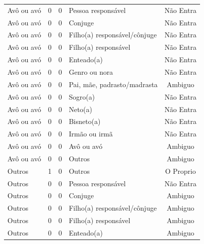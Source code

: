 \documentclass[
	12pt,				%
	openright,			%
	twoside,			%
	a4paper,			%
	english,			%
	french,				%
	spanish,			%
	brazil				%
	]{abntex2}
\begin{document}
\begin{anexosenv}
\begin{longtable}{@{}lcclc@{}}
Avô ou avó                   & 0         & 0        & Pessoa responsável           & Não Entra       \\
Avô ou avó                   & 0         & 0        & Conjuge                      & Não Entra       \\
Avô ou avó                   & 0         & 0        & Filho(a) responsável/cônjuge & Não Entra       \\
Avô ou avó                   & 0         & 0        & Filho(a) responsável         & Não Entra       \\
Avô ou avó                   & 0         & 0        & Enteado(a)                   & Não Entra       \\
Avô ou avó                   & 0         & 0        & Genro ou nora                & Não Entra       \\
Avô ou avó                   & 0         & 0        & Pai, mãe, padrasto/madrasta  & Ambiguo         \\
Avô ou avó                   & 0         & 0        & Sogro(a)                     & Não Entra       \\
Avô ou avó                   & 0         & 0        & Neto(a)                      & Não Entra       \\
Avô ou avó                   & 0         & 0        & Bisneto(a)                   & Não Entra       \\
Avô ou avó                   & 0         & 0        & Irmão ou irmã                & Não Entra       \\
Avô ou avó                   & 0         & 0        & Avô ou avó                   & Ambiguo         \\
Avô ou avó                   & 0         & 0        & Outros                       & Ambiguo         \\
Outros                       & 1         & 0        & Outros                       & O Proprio       \\
Outros                       & 0         & 0        & Pessoa responsável           & Não Entra       \\
Outros                       & 0         & 0        & Conjuge                      & Ambiguo         \\
Outros                       & 0         & 0        & Filho(a) responsável/cônjuge & Ambiguo         \\
Outros                       & 0         & 0        & Filho(a) responsável         & Ambiguo         \\
Outros                       & 0         & 0        & Enteado(a)                   & Ambiguo         \\

\end{longtable}
\end{anexosenv}
\end{document}
